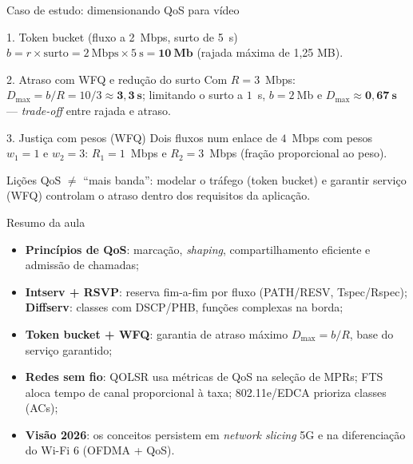 \documentclass[aspectratio=169,11pt]{beamer}
\begin{document}
\begin{frame}{Caso de estudo: dimensionando QoS para vídeo}
  \small
  \begin{block}{1. Token bucket (fluxo a 2~Mbps, surto de 5~s)}
    $b=r\times\text{surto}=2~\text{Mbps}\times 5~\text{s}=\mathbf{10~Mb}$ (rajada máxima de 1,25 MB).
  \end{block}
  \pause
  \begin{block}{2. Atraso com WFQ e redução do surto}
    Com $R=3$~Mbps: $D_{\max}=b/R=10/3\approx\mathbf{3{,}3~s}$; limitando o surto a $1$~s, $b=2~$Mb e $D_{\max}\approx\mathbf{0{,}67~s}$ --- \emph{trade-off} entre rajada e atraso.
  \end{block}
  \pause
  \begin{block}{3. Justiça com pesos (WFQ)}
    Dois fluxos num enlace de $4$~Mbps com pesos $w_1=1$ e $w_2=3$: $R_1=1$~Mbps e $R_2=3$~Mbps (fração proporcional ao peso).
  \end{block}
  \pause
  \begin{alertblock}{Lições}
    QoS $\neq$ ``mais banda'': modelar o tráfego (token bucket) e garantir serviço (WFQ) controlam o atraso dentro dos requisitos da aplicação.
  \end{alertblock}
\end{frame}

\begin{frame}{Resumo da aula}
  \begin{itemize}
    \item \textbf{Princípios de QoS}: marcação, \emph{shaping}, compartilhamento eficiente e admissão de chamadas;
    \item \textbf{Intserv + RSVP}: reserva fim-a-fim por fluxo (PATH/RESV, Tspec/Rspec); \textbf{Diffserv}: classes com DSCP/PHB, funções complexas na borda;
    \item \textbf{Token bucket + WFQ}: garantia de atraso máximo $D_{\max}=b/R$, base do serviço garantido;
    \item \textbf{Redes sem fio}: QOLSR usa métricas de QoS na seleção de MPRs; FTS aloca tempo de canal proporcional à taxa; 802.11e/EDCA prioriza classes (ACs);
    \item \textbf{Visão 2026}: os conceitos persistem em \emph{network slicing} 5G e na diferenciação do Wi-Fi 6 (OFDMA + QoS).
  \end{itemize}
\end{frame}
\end{document}
